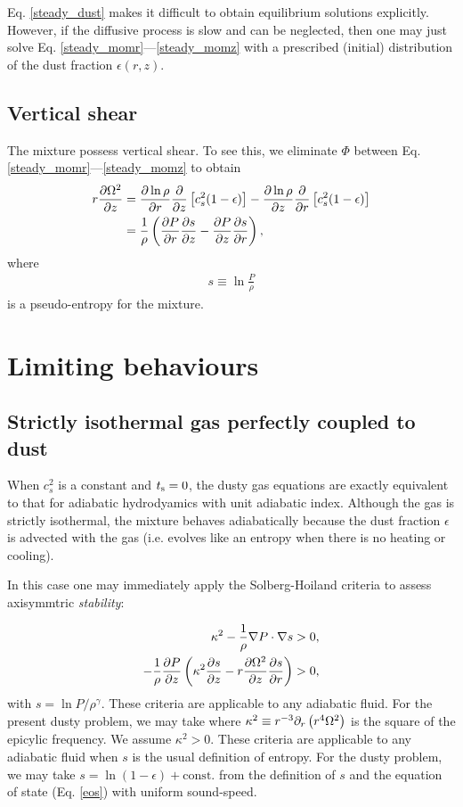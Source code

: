 Eq. \ref{steady_dust} makes it difficult to obtain equilibrium
solutions explicitly. However, if the diffusive process is slow and
can be neglected, then one may just solve
Eq. \ref{steady_momr}---\ref{steady_momz} with a prescribed (initial)
distribution of the dust fraction $\epsilon(r,z)$. 

\subsection{Vertical shear}
The mixture possess vertical shear. To see this, we eliminate $\Phi$
between Eq. \ref{steady_momr}---\ref{steady_momz} to 
obtain 
\begin{align}\label{vshear}
  r\frac{\partial \Omega^2}{\partial z} &= \frac{\partial\ln{\rho}}{\partial r}\frac{\partial}{\partial
    z}\left[c_s^2(1-\epsilon)\right] - \frac{\partial\ln{\rho}}{\partial z}
  \frac{\partial}{\partial r} \left[c_s^2(1-\epsilon)\right]\\  
  & = \frac{1}{\rho}\left(\frac{\partial P}{\partial r}\frac{\partial s}{\partial z} -\frac{\partial
    P}{\partial z}\frac{\partial s}{\partial r} \right),\notag
\end{align}
where
\begin{align}
   s \equiv \ln \frac{P}{\rho}
\end{align}
is a pseudo-entropy for the mixture. 

\section{Limiting behaviours}

\subsection{Strictly isothermal gas perfectly coupled to dust}  
When $c_s^2$ is a constant and $t_\mathrm{s}=0$, the dusty gas equations are
exactly equivalent to that for adiabatic hydrodyamics with unit adiabatic
index. Although the gas is strictly isothermal, the mixture behaves 
adiabatically because the dust fraction $\epsilon$ is advected with
the gas (i.e. evolves like an entropy when there is no heating or
cooling). 

In this case one may immediately apply the Solberg-Hoiland
criteria to assess axisymmtric \emph{stability}:  

\begin{align}
  \kappa^2 - \frac{1}{\rho}\nabla P \cdot \nabla s &> 0,\\
  -\frac{1}{\rho}\frac{\partial P}{\partial z} \left(\kappa^2 \frac{\partial s}{\partial z} -
  r\frac{\partial\Omega^2}{\partial z}\frac{\partial s}{\partial r}\right) &>0, 
\end{align}
with $s = \ln{P/\rho^\gamma}$. These criteria are applicable to any adiabatic fluid. 
For the present dusty problem, we may take 
where $\kappa^2 \equiv r^{-3}\partial_r\left(r^4\Omega^2\right)$ is the
square of the epicylic frequency. We assume $\kappa^2>0$. 
These criteria are applicable to any adiabatic fluid when $s$
is the usual definition of entropy. For the dusty problem, we may take 
$s=\ln{(1-\epsilon)}+\mathrm{const.}$ from the definition of $s$ and  
the equation of state (Eq. \ref{eos}) with uniform sound-speed. 

